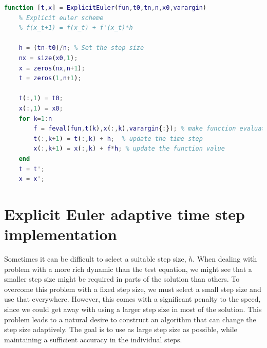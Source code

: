 \begin{lstlisting}[language=Matlab,caption=Explicit Euler with fixed step size,label=lst2:ex_euler]
function [t,x] = ExplicitEuler(fun,t0,tn,n,x0,varargin)
    % Explicit euler scheme 
    % f(x_t+1) = f(x_t) + f'(x_t)*h
    
    h = (tn-t0)/n; % Set the step size
    nx = size(x0,1);
    x = zeros(nx,n+1);
    t = zeros(1,n+1);

	t(:,1) = t0;
	x(:,1) = x0;
    for k=1:n
        f = feval(fun,t(k),x(:,k),varargin{:}); % make function evaluation 
        t(:,k+1) = t(:,k) + h;  % update the time step
        x(:,k+1) = x(:,k) + f*h; % update the function value
    end
	t = t';
	x = x';
\end{lstlisting}


\section{Explicit Euler adaptive time step implementation}
Sometimes it can be difficult to select a suitable step size, $h$. When dealing with problem with a more rich dynamic than the test equation, we might see that a smaller step size might be required in parts of the solution than others. To overcome this problem with a fixed step size, we must select a small step size and use that everywhere. However, this comes with a significant penalty to the speed, since we could get away with using a larger step size in most of the solution. This problem leads to a natural desire to construct an algorithm that can change the step size adaptively. The goal is to use as large step size as possible, while maintaining a sufficient accuracy in the individual steps. 

